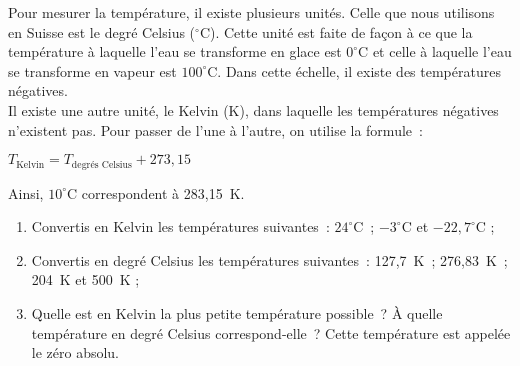 \begin{exercice}[Températures]
Pour mesurer la température, il existe plusieurs unités. Celle que nous utilisons en Suisse est le degré Celsius ($^{\circ}$C). Cette unité est faite de façon à ce que la température à laquelle l'eau se transforme en glace est $0^{\circ}$C et celle à laquelle l'eau se transforme en vapeur est $100^{\circ}$C. Dans cette échelle, il existe des températures négatives. \\[0.5em]
Il existe une autre unité, le Kelvin (K), dans laquelle les températures négatives n'existent pas. Pour passer de l'une à l'autre, on utilise la formule :
\begin{center} $T_\text{Kelvin} = T_\text{degrés Celsius} + 273,15$ \end{center}
Ainsi, $10^{\circ}$C correspondent à 283,15 K.
\begin{enumerate}
 \item Convertis en Kelvin les températures suivantes : $24^{\circ}$C ; $-3^{\circ}$C et $-22,7^{\circ}$C ;
 \item Convertis en degré Celsius les températures suivantes : 127,7 K ; 276,83 K ; 204 K et 500 K ;
 \item Quelle est en Kelvin la plus petite température possible ? À quelle température en degré Celsius correspond-elle ? Cette température est appelée le zéro absolu.
 \end{enumerate}
\end{exercice}

